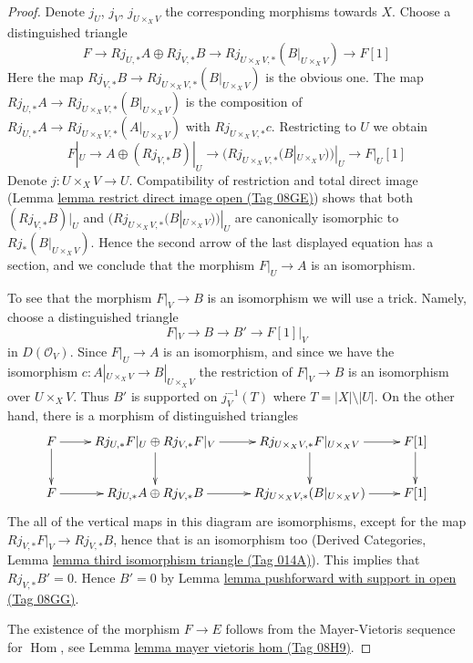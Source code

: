 \documentclass{amsart}
\theoremstyle{plain}
\theoremstyle{definition}
\theoremstyle{remark}
\numberwithin{equation}{subsection}
\def\Hom{\mathop{\mathrm{Hom}}\nolimits}
\begin{document}
\begin{proof}
Denote $j_U$, $j_V$, $j_{U \times_X V}$ the corresponding morphisms towards
$X$. Choose a distinguished triangle
$$
F \to Rj_{U, *}A \oplus Rj_{V, *}B \to
Rj_{U \times_X V, *}(B|_{U \times_X V}) \to F[1]
$$
Here the map $Rj_{V, *}B \to Rj_{U \times_X V, *}(B|_{U \times_X V})$
is the obvious one. The map
$Rj_{U, *}A \to Rj_{U \times_X V, *}(B|_{U \times_X V})$
is the composition of
$Rj_{U, *}A \to Rj_{U \times_X V, *}(A|_{U \times_X V})$
with $Rj_{U \times_X V, *}c$. Restricting to $U$ we obtain
$$
F|_U \to A \oplus (Rj_{V, *}B)|_U \to
(Rj_{U \times_X V, *}(B|_{U \times_X V}))|_U \to F|_U[1]
$$
Denote $j : U \times_X V \to U$. Compatibility of restriction and
total direct image (Lemma \href{https://stacks.math.columbia.edu/tag/08GE}{lemma restrict direct image open (Tag 08GE)})
shows that both $(Rj_{V, *}B)|_U$ and
$(Rj_{U \times_X V, *}(B|_{U \times_X V}))|_U$
are canonically isomorphic to $Rj_*(B|_{U \times_X V})$.
Hence the second arrow of the last displayed equation has
a section, and we conclude that the morphism $F|_U \to A$ is
an isomorphism.

\medskip\noindent
To see that the morphism $F|_V \to B$ is an isomorphism we will use a trick.
Namely, choose a distinguished triangle
$$
F|_V \to B \to B' \to F[1]|_V
$$
in $D(\mathcal{O}_V)$. Since $F|_U \to A$ is an isomorphism, and since
we have the isomorphism $c : A|_{U \times_X V} \to B|_{U \times_X V}$
the restriction of $F|_V \to B$ is an isomorphism over $U \times_X V$.
Thus $B'$ is supported on $j_V^{-1}(T)$ where $T = |X| \setminus |U|$.
On the other hand, there is a morphism of distinguished triangles
$$
\xymatrix{
F \ar[r] \ar[d] &
Rj_{U, *}F|_U \oplus Rj_{V, *}F|_V \ar[r] \ar[d] &
Rj_{U \times_X V, *}F|_{U \times_X V} \ar[r] \ar[d] &
F[1] \ar[d] \\
F \ar[r] &
Rj_{U, *}A \oplus Rj_{V, *}B \ar[r] &
Rj_{U \times_X V, *}(B|_{U \times_X V}) \ar[r] &
F[1]
}
$$
The all of the vertical maps in this diagram are isomorphisms, except
for the map $Rj_{V, *}F|_V \to Rj_{V, *}B$, hence that is an isomorphism too
(Derived Categories, Lemma \href{https://stacks.math.columbia.edu/tag/014A}{lemma third isomorphism triangle (Tag 014A)}).
This implies that $Rj_{V, *}B' = 0$. Hence $B' = 0$ by
Lemma \href{https://stacks.math.columbia.edu/tag/08GG}{lemma pushforward with support in open (Tag 08GG)}.

\medskip\noindent
The existence of the morphism $F \to E$ follows
from the Mayer-Vietoris sequence for $\Hom$, see
Lemma \href{https://stacks.math.columbia.edu/tag/08H9}{lemma mayer vietoris hom (Tag 08H9)}.
\end{proof}
\end{document}
